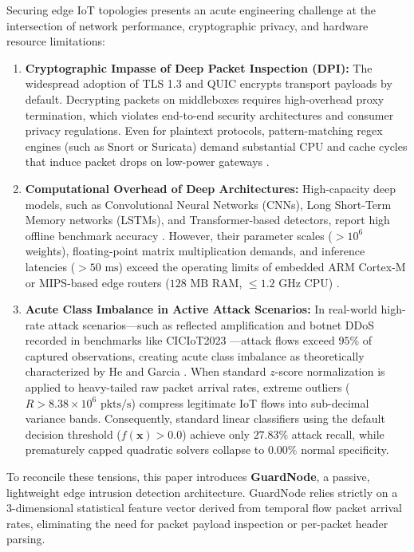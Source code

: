 \documentclass[conference]{IEEEtran}
\begin{document}
Securing edge IoT topologies presents an acute engineering challenge at the intersection of network performance, cryptographic privacy, and hardware resource limitations:
\begin{enumerate}
    \item \textbf{Cryptographic Impasse of Deep Packet Inspection (DPI):} The widespread adoption of TLS 1.3 and QUIC encrypts transport payloads by default. Decrypting packets on middleboxes requires high-overhead proxy termination, which violates end-to-end security architectures and consumer privacy regulations. Even for plaintext protocols, pattern-matching regex engines (such as Snort or Suricata) demand substantial CPU and cache cycles that induce packet drops on low-power gateways \cite{ref_chaabouni}.
    \item \textbf{Computational Overhead of Deep Architectures:} High-capacity deep models, such as Convolutional Neural Networks (CNNs), Long Short-Term Memory networks (LSTMs), and Transformer-based detectors, report high offline benchmark accuracy \cite{ref_vinayakumar}. However, their parameter scales ($> 10^6$ weights), floating-point matrix multiplication demands, and inference latencies ($> 50\text{ ms}$) exceed the operating limits of embedded ARM Cortex-M or MIPS-based edge routers ($128\text{ MB}$ RAM, $\le 1.2\text{ GHz}$ CPU) \cite{ref_khraisat}.
    \item \textbf{Acute Class Imbalance in Active Attack Scenarios:} In real-world high-rate attack scenarios—such as reflected amplification and botnet DDoS recorded in benchmarks like CICIoT2023 \cite{ref_ciciot2023}—attack flows exceed $95\%$ of captured observations, creating acute class imbalance as theoretically characterized by He and Garcia \cite{ref_he}. When standard $z$-score normalization is applied to heavy-tailed raw packet arrival rates, extreme outliers ($R > 8.38 \times 10^6\text{ pkts/s}$) compress legitimate IoT flows into sub-decimal variance bands. Consequently, standard linear classifiers using the default decision threshold ($f(\mathbf{x}) > 0.0$) achieve only $27.83\%$ attack recall, while prematurely capped quadratic solvers collapse to $0.00\%$ normal specificity.
\end{enumerate}

To reconcile these tensions, this paper introduces \textbf{GuardNode}, a passive, lightweight edge intrusion detection architecture. GuardNode relies strictly on a 3-dimensional statistical feature vector derived from temporal flow packet arrival rates, eliminating the need for packet payload inspection or per-packet header parsing.
\end{document}
